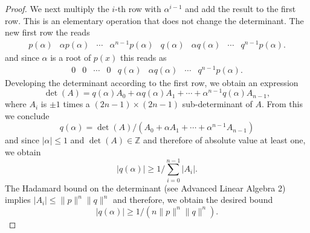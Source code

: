 \begin{proof}
  We next multiply the $i$-th row with $α^{i-1}$ and add the result  to the first row. This is an elementary operation that does not change the determinant.  The new first row the reads
  \begin{displaymath}
    \begin{matrix}
          p(α)  & α p(α) & \cdots & α^{n-1} p(α) &  q(α)  & α q(α) & \cdots & q^{n-1} p(α). 
        \end{matrix}        
      \end{displaymath}
      and since $α$ is a root of $p(x)$ this reads as
       \begin{displaymath}
    \begin{matrix}
          0  & 0 & \cdots & 0 &  q(α)  & α q(α) & \cdots &q^{n-1} p(α). 
        \end{matrix}        
      \end{displaymath}
      Developing the determinant according to the first row, we obtain an expression
      \begin{equation}
        \label{eq:27}
        \det(A) = q(α) A_0 + αq(α) A_1 + \cdots + α^{n-1} q(α) A_{n-1}, 
      \end{equation}
      where $A_i$ is $\pm1$ times a $(2n-1) ×(2n-1)$ sub-determinant of $A$.
      From this we conclude
      \begin{equation}
        \label{eq:28}
        q(α) = \det(A) / (A_0 + α A_1 + \cdots + α^{n-1}  A_{n-1})
      \end{equation}
      and since $|α| ≤1$ and $\det(A) ∈ℤ$ and therefore of absolute value at least one, we obtain
      \begin{displaymath}
        |q(α)| ≥ 1 / ∑_{i=0}^{n-1} |A_i|. 
      \end{displaymath}
      The Hadamard bound on the determinant (see Advanced Linear Algebra 2) implies $|A_i| ≤ \|p\|^n \|q\|^n$ and therefore, we obtain the desired bound
       \begin{displaymath}
        |q(α)| ≥ 1 / (n \|p\|^n \|q\|^n) . 
      \end{displaymath}
\end{proof}



